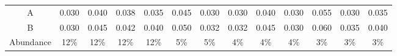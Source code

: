 \begin{tabular}{ccccccccccccc}
   \hline
A & 0.030 & 0.040 & 0.038 & 0.035 & 0.045 & 0.030 & 0.030 & 0.040 & 0.030 & 0.055 & 0.030 & 0.035 \\ 
  B & 0.030 & 0.045 & 0.042 & 0.040 & 0.050 & 0.032 & 0.032 & 0.045 & 0.030 & 0.060 & 0.035 & 0.040 \\ 
  Abundance & 12\% & 12\% & 12\% & 12\% & 5\% & 5\% & 4\% & 4\% & 4\% & 3\% & 3\% & 3\% \\ 
   \hline
\end{tabular}
